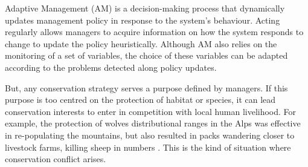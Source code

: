 \documentclass[12pt,a4paper]{article}
\begin{document}
Adaptive Management (AM) is a decision-making process that dynamically updates management policy in response to the system's behaviour.
Acting regularly allows managers to acquire information on how the system responds to change to update the policy heuristically.
Although AM also relies on the monitoring of a set of variables, the choice of these variables can be adapted according to the problems detected along policy updates. 
%
%
%

But, any conservation strategy serves a purpose defined by managers.
If this purpose is too centred on the protection of habitat or species, it can lead conservation interests to enter in competition with local human livelihood.
For example, the protection of wolves distributional ranges in the Alps was effective in re-populating the mountains, but also resulted in packs wandering closer to livestock farms, killing sheep in numbers \citep{behr2017combining}.
This is the kind of situation where conservation conflict arises.
\end{document}
